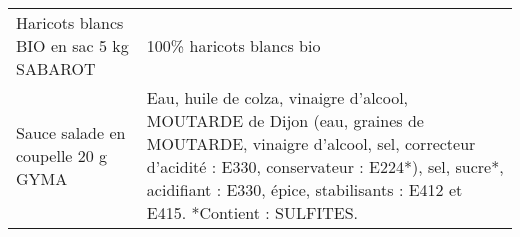 \begin{longtable}{p{5cm}p{10cm}}
                                                                  Haricots blancs BIO en sac 5 kg SABAROT &                                                                                                                                                                                                                                                                                                                                                                                                                                                                                                                                                                                                                                                                                                                                                                                                                                                                                                                                                                                                                 100\% haricots blancs bio \\
                                                                       Sauce salade en coupelle 20 g GYMA &                                                                                                                                                                                                                                                                                                                                                                                                                                                                                                                                                                                                                                                                                                                                                                              Eau, huile de colza, vinaigre d'alcool, MOUTARDE de Dijon (eau, graines de MOUTARDE, vinaigre d'alcool, sel, correcteur d'acidité : E330, conservateur : E224*), sel, sucre*, acidifiant : E330, épice, stabilisants : E412 et E415.  *Contient : SULFITES. \\

\end{longtable}
